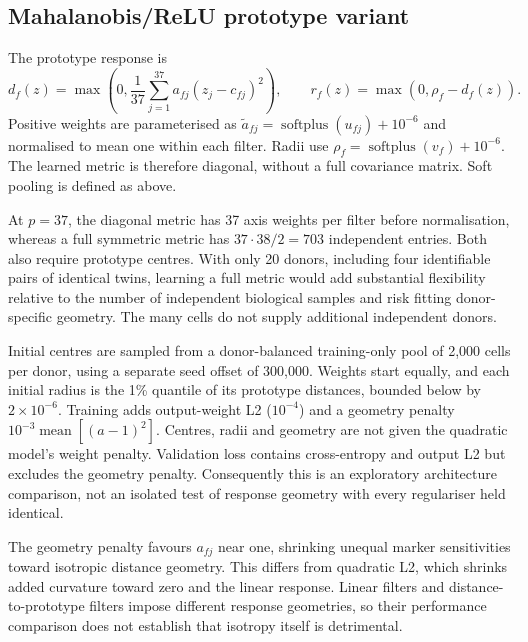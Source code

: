\documentclass[11pt,a4paper]{article}
\begin{document}
\subsection{Mahalanobis/ReLU prototype variant}
The prototype response is
\[
d_f(z)=\max\left(0,\frac1{37}\sum_{j=1}^{37}a_{fj}(z_j-c_{fj})^2\right),
\qquad r_f(z)=\max(0,\rho_f-d_f(z)).
\]
Positive weights are parameterised as $\tilde a_{fj}=\operatorname{softplus}(u_{fj})+10^{-6}$ and normalised to mean one within each filter. Radii use $\rho_f=\operatorname{softplus}(v_f)+10^{-6}$. The learned metric is therefore diagonal, without a full covariance matrix. Soft pooling is defined as above.

At $p=37$, the diagonal metric has 37 axis weights per filter before normalisation, whereas a full symmetric metric has $37\cdot38/2=703$ independent entries. Both also require prototype centres. With only 20 donors, including four identifiable pairs of identical twins, learning a full metric would add substantial flexibility relative to the number of independent biological samples and risk fitting donor-specific geometry. The many cells do not supply additional independent donors.

Initial centres are sampled from a donor-balanced training-only pool of 2,000 cells per donor, using a separate seed offset of 300,000. Weights start equally, and each initial radius is the 1\% quantile of its prototype distances, bounded below by $2\times10^{-6}$. Training adds output-weight L2 ($10^{-4}$) and a geometry penalty $10^{-3}\operatorname{mean}[(a-1)^2]$. Centres, radii and geometry are not given the quadratic model's weight penalty. Validation loss contains cross-entropy and output L2 but excludes the geometry penalty. Consequently this is an exploratory architecture comparison, not an isolated test of response geometry with every regulariser held identical.

The geometry penalty favours $a_{fj}$ near one, shrinking unequal marker sensitivities toward isotropic distance geometry. This differs from quadratic L2, which shrinks added curvature toward zero and the linear response. Linear filters and distance-to-prototype filters impose different response geometries, so their performance comparison does not establish that isotropy itself is detrimental.
\end{document}
